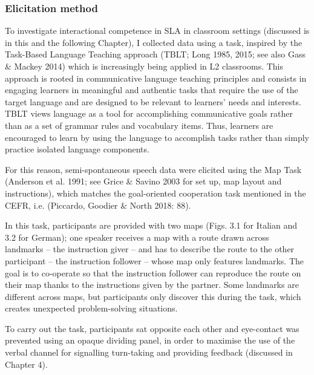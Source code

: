\subsubsection{Elicitation method}
\hypertarget{Toc191305931}{}\begin{styleStandard}
To investigate interactional competence in SLA in classroom settings (discussed is in this and the following Chapter), I collected data using a task, inspired by the Task-Based Language Teaching approach (TBLT; Long 1985, 2015; see also Gass \& Mackey 2014) which is increasingly being applied in L2 classrooms. This approach is rooted in communicative language teaching principles and consists in engaging learners in meaningful and authentic tasks that require the use of the target language and are designed to be relevant to learners' needs and interests. TBLT views language as a tool for accomplishing communicative goals rather than as a set of grammar rules and vocabulary items. Thus, learners are encouraged to learn by using the language to accomplish tasks rather than simply practice isolated language components.
\end{styleStandard}

\begin{styleStandard}
For this reason, semi-spontaneous speech data were elicited using the Map Task (Anderson et al. 1991; see Grice \& Savino 2003 for set up, map layout and instructions), which matches the goal-oriented cooperation task mentioned in the CEFR, i.e. (Piccardo, Goodier \& North 2018: 88). 
\end{styleStandard}

\begin{styleStandard}
In this task, participants are provided with two maps (Figs. 3.1 for Italian and 3.2 for German); one speaker receives a map with a route drawn across landmarks – the instruction giver – and has to describe the route to the other participant – the instruction follower – whose map only features landmarks. The goal is to co-operate so that the instruction follower can reproduce the route on their map thanks to the instructions given by the partner. Some landmarks are different across maps, but participants only discover this during the task, which creates unexpected problem-solving situations. 
\end{styleStandard}

\begin{styleStandard}
To carry out the task, participants sat opposite each other and eye-contact was prevented using an opaque dividing panel, in order to maximise the use of the verbal channel for signalling turn-taking and providing feedback (discussed in Chapter 4). 
\end{styleStandard}

